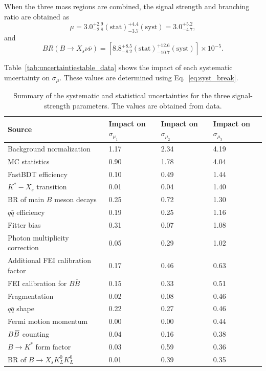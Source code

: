 When the three mass regions are combined, the signal strength and branching ratio are obtained as
\begin{equation}
    \mu = 3.0^{+2.9}_{-2.8}(\textrm{stat})^{+4.4}_{-3.7}(\textrm{syst})=3.0^{+5.2}_{-4.7},
\end{equation}
and
\begin{equation}
    BR(B\rightarrow X_{s} \nu \bar{\nu}) = [8.8^{+8.5}_{-8.2}(\textrm{stat})^{+12.6}_{-10.7}(\textrm{syst})]\times 10^{-5}.
\end{equation}

Table~\ref{tab:uncertaintiestable_data} shows the impact of each systematic uncertainty on $\sigma_{\mu}$.
These values are determined using Eq.~\ref{eq:syst_break}.
\begin{table}
\caption{Summary of the systematic and statistical uncertainties for the three signal-strength parameters. The values are obtained from data.}
  \renewcommand{\arraystretch}{1.4}
  \centering
\begin{tabular}{ p{6cm} p{2.5cm} p{2.5cm} p{2.5cm}}
 \hline
  \hline
Source & Impact on $\sigma_{\mu_{1}}$ & Impact on $\sigma_{\mu_{2}}$ & Impact on $\sigma_{\mu_{3}}$\\
 \hline
Background normalization & 1.17 & 2.34 & 4.19 \\
MC statistics & 0.90 & 1.78 & 4.04 \\
FastBDT efficiency & 0.10 & 0.49 & 1.44 \\
$K^{*}-X_{s}$ transition & 0.01 & 0.04 & 1.40 \\
BR of main $B$ meson decays & 0.25 & 0.72 & 1.30 \\
$q\bar{q}$ efficiency & 0.19 & 0.25 & 1.16 \\
Fitter bias & 0.31 & 0.07 & 1.08 \\
Photon multiplicity correction & 0.05 & 0.29 & 1.02 \\
Additional FEI calibration factor & 0.17 & 0.46 & 0.63 \\
FEI calibration for $B\bar{B}$ & 0.15 & 0.33 & 0.51 \\
Fragmentation & 0.02 & 0.08 & 0.46 \\
$q\bar{q}$ shape & 0.22 & 0.27 & 0.46 \\
Fermi motion momentum & 0.00 & 0.00 & 0.44 \\
$B\kern 0.18em\overline{\kern -0.18em B}{}$ counting & 0.04 & 0.16 & 0.38 \\
$B\rightarrow K^{*}$ form factor & 0.03 & 0.59 & 0.36 \\
BR of $B \rightarrow X_{s} K_{L}^{0} K_{L}^{0}$ & 0.01 & 0.39 & 0.35 \\

\end{tabular}
\end{table}
